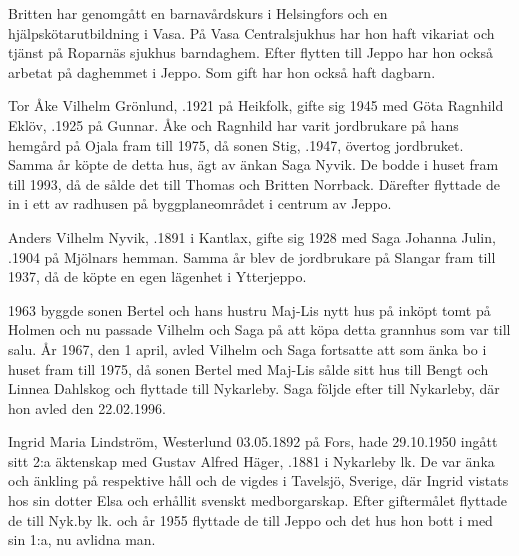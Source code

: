 Britten har genomgått en barnavårdskurs i Helsingfors och en hjälpskötarutbildning i Vasa. På Vasa Centralsjukhus har hon haft vikariat och tjänst på Roparnäs sjukhus barndaghem. Efter flytten till Jeppo har hon också  arbetat på daghemmet i Jeppo. Som gift har hon också haft dagbarn.
\begin{jhchildren}
  \item {}
  \item {}
  \item {}
\end{jhchildren}


%
Tor Åke Vilhelm Grönlund, .1921 på Heikfolk, gifte sig 1945 med Göta Ragnhild Eklöv, .1925 på Gunnar. Åke och Ragnhild har varit jordbrukare på hans hemgård på Ojala fram till 1975, då sonen Stig, .1947, övertog jordbruket. Samma år köpte de detta hus, ägt av änkan Saga Nyvik. De bodde i huset fram till 1993, då de sålde det till Thomas och Britten Norrback. Därefter flyttade de in i ett av radhusen på byggplaneområdet i centrum av Jeppo.


%
Anders Vilhelm Nyvik, .1891 i Kantlax, gifte sig 1928 med Saga Johanna Julin, .1904 på Mjölnars hemman. Samma år blev de jordbrukare på Slangar fram till 1937, då de köpte en egen lägenhet i Ytterjeppo.

1963 byggde sonen Bertel och hans hustru Maj-Lis nytt hus på inköpt tomt på Holmen och nu passade Vilhelm och Saga på att köpa detta grannhus som var till salu. År 1967, den 1 april, avled Vilhelm och Saga fortsatte att som änka bo i huset fram till 1975, då sonen Bertel med Maj-Lis sålde sitt hus till Bengt och Linnea Dahlskog och flyttade till Nykarleby. Saga följde efter till Nykarleby, där hon avled den 22.02.1996.


%
Ingrid Maria Lindström, \textborn Westerlund 03.05.1892 på Fors, hade 29.10.1950 ingått sitt 2:a äktenskap med Gustav Alfred Häger, .1881 i Nykarleby lk. De var änka och änkling på respektive håll och de vigdes i Tavelsjö, Sverige, där Ingrid vistats hos sin dotter Elsa och erhållit svenskt medborgarskap. Efter giftermålet flyttade de till Nyk.by lk. och år 1955 flyttade de till Jeppo och det hus hon bott i med sin 1:a, nu avlidna man.

